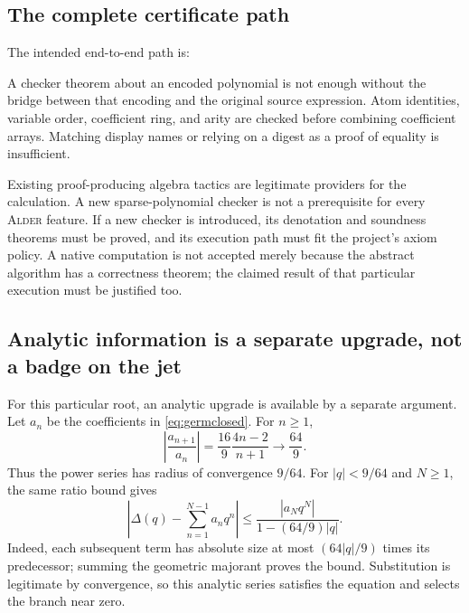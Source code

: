 \documentclass[11pt,a4paper]{article}
\newcommand{\Alder}{\textsc{Alder}}
\theoremstyle{plain}
\theoremstyle{definition}
\theoremstyle{remark}
\begin{document}
\subsection{The complete certificate path}
The intended end-to-end path is:
\begin{center}
\end{center}
A checker theorem about an encoded polynomial is not enough without the bridge between that encoding and the original source expression. Atom identities, variable order, coefficient ring, and arity are checked before combining coefficient arrays. Matching display names or relying on a digest as a proof of equality is insufficient.

Existing proof-producing algebra tactics are legitimate providers for the calculation. A new sparse-polynomial checker is not a prerequisite for every \Alder{} feature. If a new checker is introduced, its denotation and soundness theorems must be proved, and its execution path must fit the project's axiom policy. A native computation is not accepted merely because the abstract algorithm has a correctness theorem; the claimed result of that particular execution must be justified too.

\subsection{Analytic information is a separate upgrade, not a badge on the jet}
For this particular root, an analytic upgrade is available by a separate argument. Let $a_n$ be the coefficients in \eqref{eq:germclosed}. For $n\ge1$,
\[
 \left|\frac{a_{n+1}}{a_n}\right|
 =\frac{16}{9}\frac{4n-2}{n+1}\longrightarrow\frac{64}{9}.
\]
Thus the power series has radius of convergence $9/64$. For $|q|<9/64$ and $N\ge1$, the same ratio bound gives
\begin{equation}\label{eq:germ-error}
 \left|\Delta(q)-\sum_{n=1}^{N-1}a_nq^n\right|
 \le \frac{|a_Nq^N|}{1-(64/9)|q|}.
\end{equation}
Indeed, each subsequent term has absolute size at most $(64|q|/9)$ times its predecessor; summing the geometric majorant proves the bound. Substitution is legitimate by convergence, so this analytic series satisfies the equation and selects the branch near zero.
\end{document}
